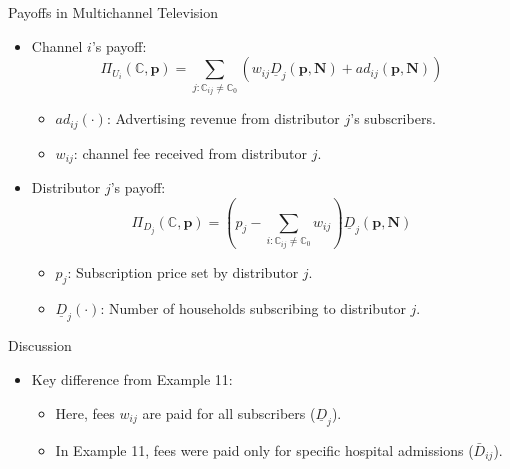\documentclass[aspectratio=169]{beamer}  %
\begin{document}
\begin{frame}{Payoffs in Multichannel Television}
    \begin{itemize}
        \item Channel \(i\)'s payoff:
        \[
        \Pi_{U_i}(\mathbb{C}, \boldsymbol{p}) = \sum_{j : \mathbb{C}_{ij} \neq \mathbb{C}_0} \left(w_{ij} \underline{D}_j(\boldsymbol{p}, \boldsymbol{N}) + ad_{ij}(\boldsymbol{p}, \boldsymbol{N})\right)
        \]
        \begin{itemize}
            \item \(ad_{ij}(\cdot)\): Advertising revenue from distributor \(j\)'s subscribers.
            \item $w_{ij}$: channel fee received from distributor $j$.
        \end{itemize}

        \item Distributor \(j\)'s payoff:
        \[
        \Pi_{D_j}(\mathbb{C}, \boldsymbol{p}) = \left(p_j - \sum_{i : \mathbb{C}_{ij} \neq \mathbb{C}_0} w_{ij}\right) \underline{D}_j(\boldsymbol{p}, \boldsymbol{N})
        \]
        \begin{itemize}
            \item \(p_j\): Subscription price set by distributor \(j\).
            \item \(\underline{D}_j(\cdot)\): Number of households subscribing to distributor \(j\).
        \end{itemize}

    \end{itemize}
\end{frame}

\begin{frame}{Discussion}
    \begin{itemize}
            \item Key difference from Example 11:
        \begin{itemize}
            \item Here, fees \(w_{ij}\) are paid for all subscribers (\(\underline{D}_j\)).
            \item In Example 11, fees were paid only for specific hospital admissions (\(\bar{D}_{ij}\)).
        \end{itemize}
    \end{itemize}
\end{frame}
\end{document}
